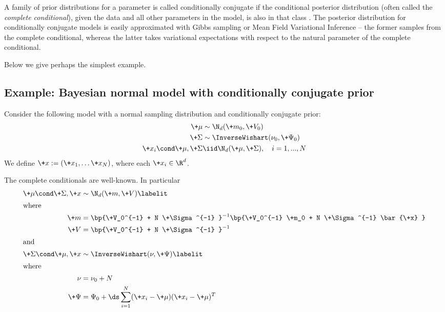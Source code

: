 \documentclass{article} %
\begin{document}
A family of prior distributions for a parameter is called conditionally conjugate if the conditional posterior distribution (often called the \textit{complete conditional}),  given the data and all other parameters in the model,  is also in that class  \cite{gelman2006prior}.    The posterior distribution for conditionally conjugate models is easily approximated with Gibbs sampling or Mean Field Variational Inference -- the former samples from the complete conditional,  whereas the latter takes variational expectations with respect to the natural parameter of the complete conditional.

Below we give perhaps the simplest example. 

\subsection{Example:  Bayesian normal model with conditionally conjugate prior} \label{sec:normal_data_with_non_conjugate_prior}

Consider the following model with a normal sampling distribution and conditionally conjugate prior:
\begin{align*}
\+\mu &\sim \N_{d}(\+m_0,\+V_0 ) \\
\+\Sigma &\sim \InverseWishart(\nu_0,  \+\Psi_0) \\
\+x_i \cond \+\mu,  \+\Sigma &\iid \N_{d}( \+\mu , \+\Sigma), \quad i=1,...,N
\end{align*}
We define $\+x := (\+x_1,  \hdots \+x_N)$,  where each $\+x_i \in \R^d$.

The complete conditionals are well-known.   In particular
\begin{align*}
\+\mu  \cond \+\Sigma, \+x &\sim \N_{d}(\+m,\+V )  \labelit\label{eqn:normal_model_complete_conditional_on_mu} \\
\intertext{where}
\+m  &=  \bp{\+V_0^{-1} + N  \+\Sigma^{-1} }^{-1}  \bp{\+V_0^{-1} \+m_0 + N \+\Sigma^{-1}  \bar{\+x} } \\
\+V &= \bp{\+V_0^{-1} +  N \+\Sigma^{-1} }^{-1} \\
\intertext{and}
\+\Sigma \cond \+\mu,  \+x  &\sim \InverseWishart(\nu,  \+\Psi) 
\labelit \label{eqn:normal_model_complete_conditional_on_Sigma} \\
\intertext{where}
\nu &=  \nu_0 + N \\
\+\Psi &= \Psi_0 + \ds\sum_{i=1}^N  (\+x_i - \+\mu) (\+x_i - \+\mu)^T \\ 
\end{align*}
\end{document}
